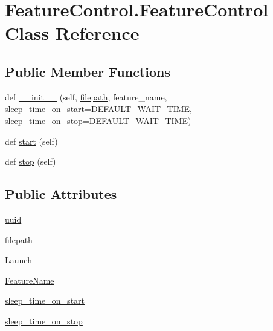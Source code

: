 \hypertarget{classFeatureControl_1_1FeatureControl}{}\section{Feature\+Control.\+Feature\+Control Class Reference}
\label{classFeatureControl_1_1FeatureControl}
\subsection*{Public Member Functions}
\begin{DoxyCompactItemize}
\item 
def \hyperlink{classFeatureControl_1_1FeatureControl_aaddbe7a1596f71ce1a6d462e728c438b}{\+\_\+\+\_\+init\+\_\+\+\_\+} (self, \hyperlink{classFeatureControl_1_1FeatureControl_a109435a4846e1d31370f92e12a9cb645}{filepath}, feature\+\_\+name, \hyperlink{classFeatureControl_1_1FeatureControl_a5911b30613b10be90a2ab8519bdc5bb2}{sleep\+\_\+time\+\_\+on\+\_\+start}=\hyperlink{namespaceFeatureControl_aeebd4e13e6a3a0dde7d720af530ae36d}{D\+E\+F\+A\+U\+L\+T\+\_\+\+W\+A\+I\+T\+\_\+\+T\+I\+ME}, \hyperlink{classFeatureControl_1_1FeatureControl_aa577601585488e8fed13f9a1ad36d7b3}{sleep\+\_\+time\+\_\+on\+\_\+stop}=\hyperlink{namespaceFeatureControl_aeebd4e13e6a3a0dde7d720af530ae36d}{D\+E\+F\+A\+U\+L\+T\+\_\+\+W\+A\+I\+T\+\_\+\+T\+I\+ME})
\item 
def \hyperlink{classFeatureControl_1_1FeatureControl_a21f4c45cce80b2be3a1110d44e12fbfc}{start} (self)
\item 
def \hyperlink{classFeatureControl_1_1FeatureControl_a1dc5cd2f9a7fe0aa97c77a4f5f6d1c86}{stop} (self)
\end{DoxyCompactItemize}
\subsection*{Public Attributes}
\begin{DoxyCompactItemize}
\item 
\hyperlink{classFeatureControl_1_1FeatureControl_af8533a40b9c881dd05254039a47c327a}{uuid}
\item 
\hyperlink{classFeatureControl_1_1FeatureControl_a109435a4846e1d31370f92e12a9cb645}{filepath}
\item 
\hyperlink{classFeatureControl_1_1FeatureControl_a13a501b445ea0db6d7ed24b09ab94402}{Launch}
\item 
\hyperlink{classFeatureControl_1_1FeatureControl_a95e3fe171ba7d3d44f3d237c204ebb0e}{Feature\+Name}
\item 
\hyperlink{classFeatureControl_1_1FeatureControl_a5911b30613b10be90a2ab8519bdc5bb2}{sleep\+\_\+time\+\_\+on\+\_\+start}
\item 
\hyperlink{classFeatureControl_1_1FeatureControl_aa577601585488e8fed13f9a1ad36d7b3}{sleep\+\_\+time\+\_\+on\+\_\+stop}
\end{DoxyCompactItemize}


